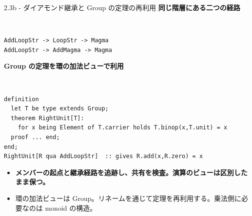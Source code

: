 \documentclass[dvipdfmx,aspectratio=169,11pt]{beamer}
\newcommand{\statusbadge}[2]{\colorbox{#1}{\textcolor{white}{\strut\scriptsize\sffamily\bfseries #2}}}
\newcommand{\badgeSketch}{\statusbadge{orange!75!black}{sketch}}
\begin{document}
\begin{frame}[fragile,t]{2.3b - ダイアモンド継承と Group の定理の再利用}
\smallskip
\textbf{同じ階層にある二つの経路}~\badgeSketch
\begin{lstlisting}[language={},basicstyle=\ttfamily\small]
AddLoopStr -> LoopStr -> Magma
AddLoopStr -> AddMagma -> Magma
\end{lstlisting}
\smallskip
\textbf{Group の定理を環の加法ビューで利用}~\badgeSketch
\begin{lstlisting}[language={mizar},basicstyle=\ttfamily\small]
definition
  let T be type extends Group;
  theorem RightUnit[T]:
    for x being Element of T.carrier holds T.binop(x,T.unit) = x
  proof ... end;
end;
RightUnit[R qua AddLoopStr]  :: gives R.add(x,R.zero) = x
\end{lstlisting}
\begin{itemize}
\setlength{\itemsep}{1pt}
\setlength{\parsep}{0pt}
\setlength{\parskip}{0pt}
\item \textcolor{blue!55!black}{\textbf{メンバーの起点と継承経路を追跡し、共有を検査。演算のビューは区別したまま保つ。}}
\item 環の加法ビューは Group。リネームを通じて定理を再利用する。乗法側に必要なのは monoid の構造。
\end{itemize}
\end{frame}
\end{document}
